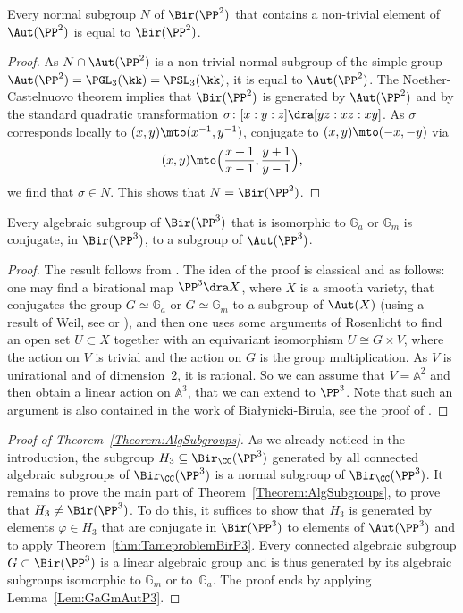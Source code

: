 \begin{lem}\label{Lem:NormalSubAutP2}
Every normal subgroup $N$ of $\Bir(\PP^2)$ that contains a non-trivial element of $\Aut(\PP^2)$ is equal to $\Bir(\PP^2)$.
\end{lem}

\begin{proof}
As $N\cap \Aut(\PP^2)$ is a non-trivial normal subgroup of the simple group $\Aut(\PP^2)=\PGL_3(\kk)=\PSL_3(\kk)$, it is equal to $\Aut(\PP^2)$.
The Noether-Castelnuovo theorem \cite{Cas} implies that $\Bir(\PP^2)$ is generated by $\Aut(\PP^2)$ and by the standard quadratic transformation $\sigma\colon [x:y:z]\dra [yz:xz:xy]$. As $\sigma$ corresponds locally to $(x,y)\mto (x^{-1},y^{-1})$, conjugate to $(x,y)\mto (-x,-y)$ via
\[
(x,y)\mto \Bigl(\frac{x+1}{x-1},\frac{y+1}{y-1}\Bigr),
\] we find that $\sigma\in N$. This shows that $N=\Bir(\PP^2)$.
\end{proof}
\begin{lem}\label{Lem:GaGmAutP3}
Every algebraic subgroup of $\Bir(\PP^3)$ that is isomorphic to $\mathbb{G}_a$ or $\mathbb{G}_m$ is conjugate, in $\Bir(\PP^3)$, to a subgroup of $\Aut(\PP^3)$.
\end{lem}
\begin{proof}The result follows from \cite[2.5.8]{BFT}.
The idea of the proof is classical and as follows: one may find a birational map $\PP^3\dra X$, where $X$ is a smooth variety, that conjugates the group $G\simeq \mathbb{G}_a$ or $G\simeq \mathbb{G}_m$ to a subgroup of $\Aut(X)$ (using a result of Weil, see \cite{Weil} or \cite{Kraft}), and then one uses some arguments of Rosenlicht to find an open set $U\subset X$ together with an equivariant isomorphism $U\cong G\times V$, where the action on $V$ is trivial and the action on $G$ is the group multiplication. As $V$ is unirational and of dimension~$2$, it is rational. So we can assume that $V=\mathbb{A}^2$ and then obtain a linear action on $\mathbb{A}^3$, that we can extend to $\PP^3$. Note that such an argument is also contained in the work of Bia\l{}ynicki-Birula, see the proof of \cite[Th.\,2]{Bia73}.
\end{proof}

\begin{proof}[Proof of Theorem~\ref{Theorem:AlgSubgroups}]
As we already noticed in the introduction, the subgroup $H_3\subseteq\Bir_{\CC}(\PP^3)$ generated by all connected algebraic subgroups of $\Bir_\CC(\PP^3)$ is a normal subgroup of $\Bir_{\CC}(\PP^3)$. It remains to prove the main part of Theorem~\ref{Theorem:AlgSubgroups}, \ie to prove that $H_3\not=\Bir(\PP^3)$. To do this, it suffices to show that $H_3$ is generated by elements $\varphi\in H_3$ that are conjugate in $\Bir(\PP^3)$ to elements of $\Aut(\PP^3)$ and to apply Theorem~\ref{thm:TameproblemBirP3}. Every connected algebraic subgroup $G\subset \Bir(\PP^3)$ is a linear algebraic group \cite[Rem.\,2.21]{BF13} and is thus generated by its algebraic subgroups isomorphic to $\mathbb{G}_m$ or to~$\mathbb{G}_a$. The proof ends by applying Lemma~\ref{Lem:GaGmAutP3}.
\end{proof}

\vspace*{\baselineskip}
